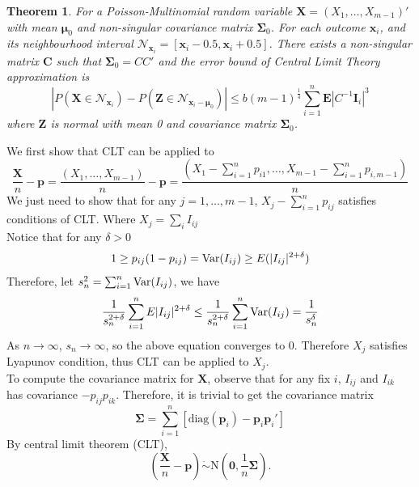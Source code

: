 \documentclass[12pt]{article}
\newcommand{\zerovec}{{\boldsymbol{0}}}
\newcommand{\EE}{\mathbf{E}}
\newcommand{\Var}{{\rm Var}}
\newcommand{\N}{\textrm{N}}
\newcommand{\diag}{\textrm{diag}}
\newcommand{\pvec}{\boldsymbol{p}}
\newtheorem{thm}{Theorem}
\begin{document}
\begin{thm}
For a Poisson-Multinomial random variable $\boldsymbol{X} = (X_1,\dots,X_{m-1})'$ with mean $\boldsymbol{\mu}_0$ and non-singular covariance matrix $\boldsymbol{\Sigma}_0$. For each outcome $\boldsymbol{\boldsymbol{x}}_i$, and its neighbourhood interval $\mathcal{N}_{\boldsymbol{\boldsymbol{x}}_i} = [\boldsymbol{\boldsymbol{x}}_i-0.5,\boldsymbol{\boldsymbol{x}}_i+0.5]$. There exists a non-singular matrix $\boldsymbol{C}$ such that $\boldsymbol{\Sigma}_0 = CC'$ and the error bound of Central Limit Theory approximation is
\begin{equation*}
    |P(\boldsymbol{X} \in \mathcal{N}_{\boldsymbol{x}_i}) - P(\boldsymbol{Z} \in \mathcal{N}_{\boldsymbol{x}_i-\boldsymbol{\mu}_0})| \leq b (m-1)^{\frac{1}{4}} \sum_{i=1}^{n}\EE|C^{-1}\boldsymbol{I}_{i}|^3
\end{equation*}
where $\boldsymbol{Z}$ is normal with mean 0 and covariance matrix $\boldsymbol{\Sigma}_0$.
\end{thm}
We first show that CLT can be applied to
\begin{equation*}
\frac{\boldsymbol{X}}{n} - \pvec = \frac{(X_1,\dots,X_{m-1})}{n} - \pvec = \frac{(X_1 - \sum_{i=1}^{n}p_{i1},\dots,X_{m-1} - \sum_{i=1}^{n}p_{i,m-1})}{n}
\end{equation*}
We just need to show that for any $j = 1,\dots,m-1$, $X_j - \sum_{i=1}^{n}p_{ij}$ satisfies conditions of CLT. Where $X_{j} = \sum_i I_{ij}$ \\
Notice that for any $\delta > 0$
\begin{equation*}
    1\geq p_{ij}(1-p_{ij}) = \Var (I_{ij}) \geq E(|I_{ij}|^{2+ \delta})
\end{equation*}
Therefore, let $s_n^2 = \sum_{i=1}^{n}\Var(I_{ij})$, we have
\begin{equation*}
    \frac{1}{s_n^{2+\delta}}\sum_{i=1}^{n}E|I_{ij}|^{2 + \delta} \leq  \frac{1}{s_n^{2+\delta}}\sum_{i=1}^{n}\Var(I_{ij}) = \frac{1}{s_n^\delta}
\end{equation*}
As $n \rightarrow \infty$, $s_n \rightarrow \infty$, so the above equation converges to 0. Therefore $X_j$ satisfies Lyapunov condition, thus CLT can be applied to $X_j$.\\
To compute the covariance matrix for $\boldsymbol{X}$,
observe that for any fix $i$, $I_{ij}$ and $I_{ik}$ has covariance $-p_{ij}p_{ik}$. Therefore, it is trivial to get the covariance matrix $$\boldsymbol{\Sigma}=\sum_{i=1}^n[\diag(\pvec_i)-\pvec_i\pvec_i']$$
By central limit theorem (CLT),
$$\left(\frac{\boldsymbol{X}}{n}-\pvec\right)\dot\sim \N\left(\zerovec, \frac{1}{n}\boldsymbol{\Sigma}\right).$$\\
\end{document}
